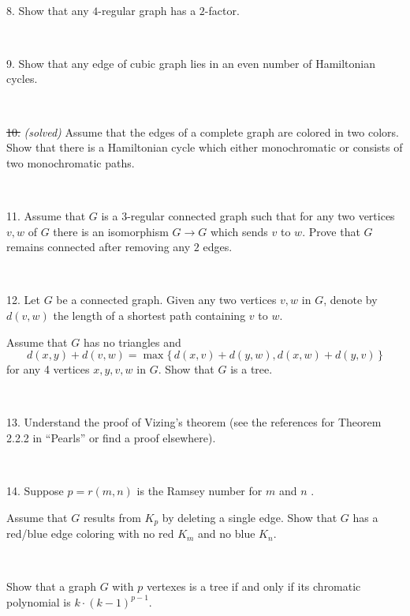 \documentclass[oneside,a4paper]{article}
\begin{document}
\ 


\noindent %
{8.} %
Show that any $4$-regular graph has a $2$-factor.

\ 


\noindent %
{9.} %
Show that any edge of cubic graph lies in an even number of Hamiltonian cycles.


\ 

\noindent \sout
{10.} \textit{(solved)} 
Assume that the edges of a complete graph are colored in two colors.
Show that there is a Hamiltonian cycle which either monochromatic or consists of two monochromatic paths.

\ 

\noindent %
{11.}  %
Assume that $G$ is a $3$-regular connected graph such that 
for any two vertices $v,w$ of $G$ there is an isomorphism
$G\to G$ which sends $v$ to $w$.
Prove that $G$ remains connected after removing any $2$ edges.

\ 


\noindent %
{12.} %
Let $G$ be a connected graph.
Given any two vertices $v,w$ in $G$, denote by $d(v,w)$ the length of a shortest path containing $v$ to $w$. 

Assume that $G$ has no triangles and
\[d(x,y)+d(v,w)=\max\{\,d(x,v)+d(y,w),d(x,w)+d(y,v)\,\}\]
for any 4 vertices $x,y,v,w$ in $G$.
Show that $G$ is a tree.

\ 

\noindent %
{13.} %
Understand the proof of Vizing's theorem (see the references for Theorem 2.2.2 in ``Pearls'' or find a proof elsewhere).

\ 

\noindent %
{14.} %
Suppose $p=r(m,n)$ is the Ramsey number for $m$ and $n$%
.

Assume that $G$ results from $K_p$ by deleting a single edge.
Show that $G$ has a red/blue edge coloring with no red
$K_m$ and no blue $K_n$.

\ 

 Show that a graph $G$ with $p$ vertexes is a tree if and only if
its chromatic polynomial is $k\cdot(k-1)^{p-1}$.
\end{document}
